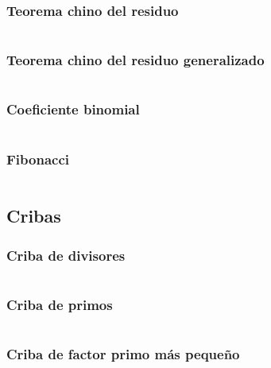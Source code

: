 \documentclass[11pt]{article}
\begin{document}
			\subsubsection{Teorema chino del residuo}
			\inputminted[tabsize=2,breaklines,firstline=108,lastline=117,fontsize=\small]{c++}{numberTheory.cpp}
			
			\subsubsection{Teorema chino del residuo generalizado}
			\inputminted[tabsize=2,breaklines,firstline=950,lastline=965,fontsize=\small]{c++}{numberTheory.cpp}
			
			\subsubsection{Coeficiente binomial}
			\inputminted[tabsize=2,breaklines,firstline=433,lastline=440,fontsize=\small]{c++}{numberTheory.cpp}
			
			\subsubsection{Fibonacci}
			\inputminted[tabsize=2,breaklines,firstline=720,lastline=741,fontsize=\small]{c++}{numberTheory.cpp}
		
		\subsection{Cribas}
			\subsubsection{Criba de divisores}
			\inputminted[tabsize=2,breaklines,firstline=119,lastline=130,fontsize=\small]{c++}{numberTheory.cpp}
			
			\subsubsection{Criba de primos}
			\inputminted[tabsize=2,breaklines,firstline=132,lastline=148,fontsize=\small]{c++}{numberTheory.cpp}
			
			\subsubsection{Criba de factor primo más pequeño}
			\inputminted[tabsize=2,breaklines,firstline=150,lastline=160,fontsize=\small]{c++}{numberTheory.cpp}
			
\end{document}
